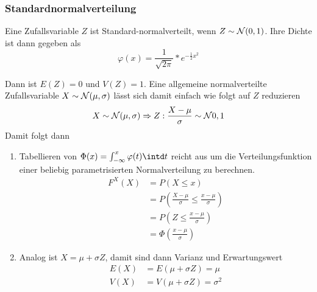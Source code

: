 \subsubsection{Standardnormalverteilung}
Eine Zufallsvariable $Z$ ist Standard-normalverteilt, wenn $Z\sim\mathcal{N}(0,1)$.
Ihre Dichte ist dann gegeben als
\begin{equation*}
	\varphi(x)=\frac{1}{\sqrt{2\pi}}*e^{-\frac12x^2}
\end{equation*}

Dann ist $E(Z)=0$ und $V(Z)=1$. Eine allgemeine normalverteilte Zufallsvariable $X\sim\mathcal{N}(\mu,\sigma)$ lässt sich damit einfach wie folgt auf $Z$ reduzieren
\begin{equation*}
	X\sim\mathcal{N}(\mu, \sigma)\Rightarrow Z:\frac{X-\mu}{\sigma}\sim\mathcal{N}{0,1}
\end{equation*}
Damit folgt dann
\begin{enumerate}
	\item Tabellieren von $\Phi(x)=\int_{-\infty}^x \varphi(t)\intd t$ reicht aus um die Verteilungsfunktion einer beliebig parametrisierten Normalverteilung zu berechnen.
	\begin{align*}
		F^X(X)&=P(X\leq x)\\
		&=P\left(\frac{X-\mu}{\sigma}\leq \frac{x-\mu}{\sigma}\right)\\
		&=P\left(Z\leq\frac{x-\mu}{\sigma}\right)\\
		&=\Phi\left(\frac{x-\mu}{\sigma}\right)
	\end{align*}
	\item Analog ist $X=\mu+\sigma Z$, damit sind dann Varianz und Erwartungswert
	\begin{align*}
		E(X)&=E(\mu+\sigma Z)=\mu\\
		V(X)&=V(\mu+\sigma Z)=\sigma^2
	\end{align*}
\end{enumerate}



